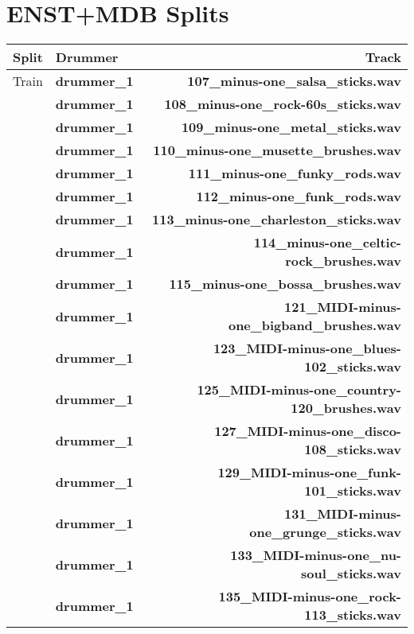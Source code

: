 \chapter{ENST+MDB Splits}\label{appendix-a}

\begin{table}[H]
    \centering
    \begin{tabular}{l|lr}
        Split & Drummer & Track \\
        \hline
        Train & \textbf{drummer\_1} & \textbf{107\_minus-one\_salsa\_sticks.wav} \\
            & \textbf{drummer\_1} & \textbf{108\_minus-one\_rock-60s\_sticks.wav} \\
            & \textbf{drummer\_1} & \textbf{109\_minus-one\_metal\_sticks.wav} \\
            & \textbf{drummer\_1} & \textbf{110\_minus-one\_musette\_brushes.wav} \\
            & \textbf{drummer\_1} & \textbf{111\_minus-one\_funky\_rods.wav} \\
            & \textbf{drummer\_1} & \textbf{112\_minus-one\_funk\_rods.wav} \\
            & \textbf{drummer\_1} & \textbf{113\_minus-one\_charleston\_sticks.wav} \\
            & \textbf{drummer\_1} & \textbf{114\_minus-one\_celtic-rock\_brushes.wav} \\
            & \textbf{drummer\_1} & \textbf{115\_minus-one\_bossa\_brushes.wav} \\
            & \textbf{drummer\_1} & \textbf{121\_MIDI-minus-one\_bigband\_brushes.wav} \\
            & \textbf{drummer\_1} & \textbf{123\_MIDI-minus-one\_blues-102\_sticks.wav} \\
            & \textbf{drummer\_1} & \textbf{125\_MIDI-minus-one\_country-120\_brushes.wav} \\
            & \textbf{drummer\_1} & \textbf{127\_MIDI-minus-one\_disco-108\_sticks.wav} \\
            & \textbf{drummer\_1} & \textbf{129\_MIDI-minus-one\_funk-101\_sticks.wav} \\
            & \textbf{drummer\_1} & \textbf{131\_MIDI-minus-one\_grunge\_sticks.wav} \\
            & \textbf{drummer\_1} & \textbf{133\_MIDI-minus-one\_nu-soul\_sticks.wav} \\
            & \textbf{drummer\_1} & \textbf{135\_MIDI-minus-one\_rock-113\_sticks.wav} \\

\end{tabular}
\end{table}
